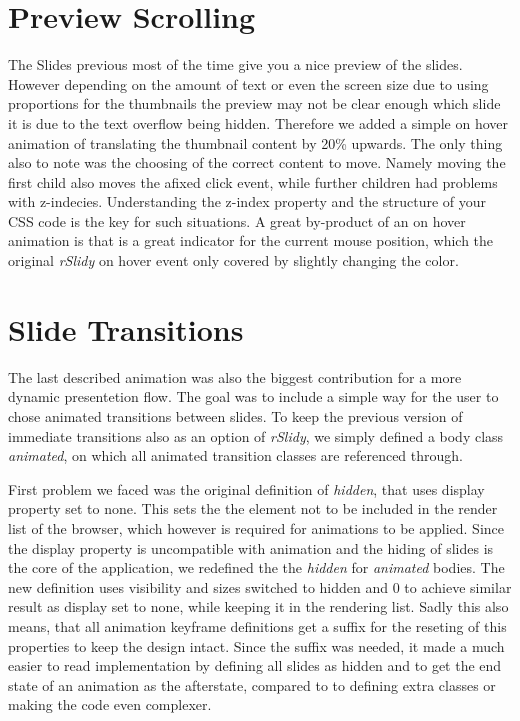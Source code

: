 
\section{Preview Scrolling} %
\label{sec:preview_scrolling}

The Slides previous most of the time give you a nice preview of the slides. However depending on the amount of text or even the screen size due to using proportions for the thumbnails the preview may not be clear enough which slide it is due to the text overflow being hidden. Therefore we added a simple on hover animation of translating the thumbnail content by 20\% upwards. The only thing also to note was the choosing of the correct content to move. Namely moving the first child also moves the afixed click event, while further children had problems with z-indecies. Understanding the z-index property and the structure of your CSS code is the key for such situations. A great by-product of an on hover animation is that is a great indicator for the current mouse position, which the original \textit{rSlidy} on hover event only covered by slightly changing the color.

\newpage
\section{Slide Transitions} %
\label{sec:slide_transitions}

The last described animation was also the biggest contribution for a more dynamic presentetion flow. The goal was to include a simple way for the user to chose animated transitions between slides. To keep the previous version of immediate transitions also as an option of \textit{rSlidy}, we simply defined a body class \textit{animated}, on which all animated transition classes are referenced through.

First problem we faced was the original definition of \textit{hidden}, that uses display property set to none. This sets the the element not to be included in the render list of the browser, which however is required for animations to be applied. Since the display property is uncompatible with animation and the hiding of slides is the core of the application, we redefined the the \textit{hidden} for \textit{animated} bodies. The new definition uses visibility and sizes switched to hidden and 0 to achieve similar result as display set to none, while keeping it in the rendering list. Sadly this also means, that all animation keyframe definitions get a suffix for the reseting of this properties to keep the design intact. Since the suffix was needed, it made a much easier to read implementation by defining all slides as hidden and to get the end state of an animation as the afterstate, compared to to defining extra classes or making the code even complexer.

